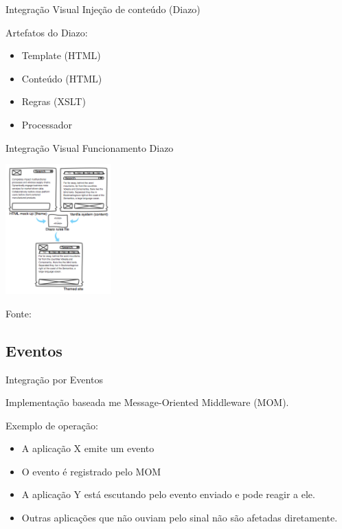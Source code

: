 \documentclass{beamer}
\begin{document}
\begin{frame}{Integração Visual}
  Injeção de conteúdo (Diazo)
  \hfill \break
  
  Artefatos do Diazo:
  \begin{itemize}
    \item{Template (HTML)}
    \item{Conteúdo (HTML)}
    \item{Regras (XSLT)}
    
    \item{Processador}
  \end{itemize}
\end{frame}

\begin{frame}{Integração Visual}
  Funcionamento Diazo
  \begin{center}
    \includegraphics[height=5cm]{diazo-concept}
  \end{center}
  \scriptsize Fonte:

\end{frame}

\subsection{Eventos}

\begin{frame}{Integração por Eventos}

  Implementação baseada me Message-Oriented Middleware (MOM).
  \hfill \break

  Exemplo de operação:
  \begin{itemize}
  \item {
    A aplicação X emite um evento
  }
  \item {
    O evento é registrado pelo MOM
  }
  \item{
    A aplicação Y está escutando pelo evento enviado e pode reagir a ele. 
  }
  \item{
    Outras aplicações que não ouviam pelo sinal não são afetadas diretamente.
  }
  \end{itemize}
\end{frame}
\end{document}
